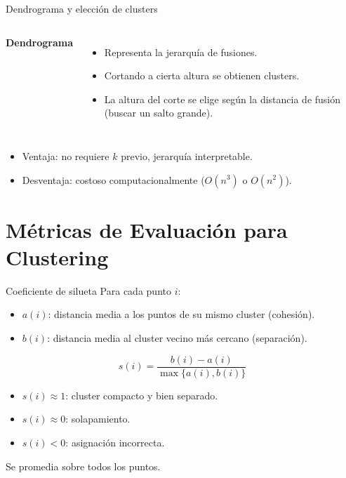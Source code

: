 \documentclass[aspectratio=169, 10pt, xcolor=table]{beamer}
\begin{document}
\begin{frame}{Dendrograma y elección de clusters}
    \begin{columns}[t]
        \textbf{Dendrograma}
        \begin{itemize}
            \item Representa la jerarquía de fusiones.
            \item Cortando a cierta altura se obtienen clusters.
            \item La altura del corte se elige según la distancia de fusión (buscar un salto grande).
        \end{itemize}
    \end{columns}
    \vspace{0.3cm}
    \begin{itemize}
        \item Ventaja: no requiere $k$ previo, jerarquía interpretable.
        \item Desventaja: costoso computacionalmente ($O(n^3)$ o $O(n^2)$).
    \end{itemize}
\end{frame}

\section{Métricas de Evaluación para Clustering}

\begin{frame}{Coeficiente de silueta}
    Para cada punto $i$:
    \begin{itemize}
        \item $a(i)$: distancia media a los puntos de su mismo cluster (cohesión).
        \item $b(i)$: distancia media al cluster vecino más cercano (separación).
    \end{itemize}
    \[
    s(i) = \frac{b(i) - a(i)}{\max\{a(i), b(i)\}}
    \]
    \begin{itemize}
        \item $s(i) \approx 1$: cluster compacto y bien separado.
        \item $s(i) \approx 0$: solapamiento.
        \item $s(i) < 0$: asignación incorrecta.
    \end{itemize}
    Se promedia sobre todos los puntos.
\end{frame}
\end{document}
